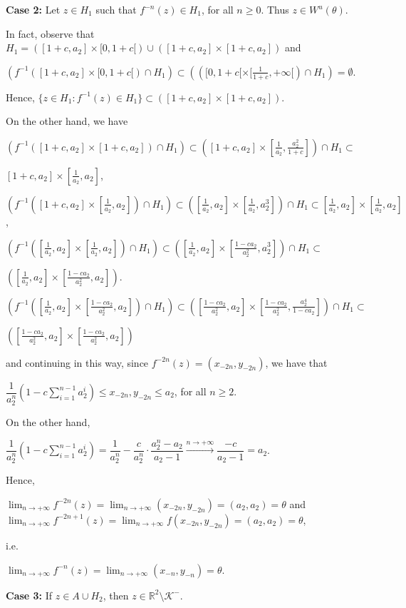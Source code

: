 \documentclass[11pt]{amsart}
\theoremstyle{definition}
\begin{document}
\noindent \textbf{Case 2:} Let $z\in H_1$ such that $f^{-n}(z)\in H_1$, for all $n\geq 0$.  Thus $z\in W^u(\theta)$.

In fact, observe that $H_1=([1+c,a_2]\times [0,1+c[)\cup ([1+c,a_2]\times
[1+c,a_2])$ and
\begin{center}
	$(f^{-1}([1+c,a_2]\times [0,1+c[)\cap H_1)\subset (([0,1+c[\times
	[\frac{1}{1+c},+\infty[)\cap H_1)=\emptyset$.
\end{center}
Hence, $\{z\in H_1: f^{-1}(z)\in H_1\}\subset ([1+c,a_2]\times
[1+c,a_2])$.

On the other hand, we have

\noindent $(f^{-1}([1+c,a_2]\times [1+c,a_2])\cap H_1)\subset ([1+c,a_2]\times
	[\frac{1}{a_2},\frac{a^2_2}{1+c}])\cap H_1\subset$

\hfill $[1+c,a_2]\times[\frac{1}{a_2},a_2]$,


\noindent $(f^{-1}([1+c,a_2]\times [\frac{1}{a_2},a_2])\cap H_1)\subset
	([\frac{1}{a_2},a_2]\times [\frac{1}{a_2},a^3_2])\cap H_1\subset
	[\frac{1}{a_2},a_2]\times[\frac{1}{a_2},a_2]$,

\noindent $(f^{-1}([\frac{1}{a_2},a_2]\times[\frac{1}{a_2},a_2])\cap
	H_1)\subset ([\frac{1}{a_2},a_2]\times[\frac{1-ca_2}{a_2^2},a_2^3
	])\cap H_1\subset$

\hfill $([\frac{1}{a_2},a_2]\times[\frac{1-ca_2}{a_2^2},a_2])$.

\noindent $(f^{-1}([\frac{1}{a_2},a_2]\times[\frac{1-ca_2}{a_2^2},a_2])\cap
	H_1)\subset ([\frac{1-ca_2}{a_2^2},a_2]
	\times[\frac{1-ca_2}{a_2^2},\frac{a_2^4}{1-ca_2} ])\cap H_1\subset$

\hfill $([\frac{1-ca_2}{a_2^2},a_2]\times[\frac{1-ca_2}{a_2^2},a_2])$

\noindent and continuing in this way, since $f^{-2n}(z)=(x_{-2n},y_{-2n})$, we have that
\begin{center}
	$\dfrac{1}{a_2^{n}}\displaystyle \left(1-c\sum_{i=1}^{n-1} a_2^i\right)\leq
	x_{-2n},y_{-2n}\leq a_2$, for all $n\geq 2$.
\end{center}

On the other hand,

\begin{center}
	$\dfrac{1}{a_2^{n}}\displaystyle \left(1-c\sum_{i=1}^{n-1}
	a_2^i\right)=\dfrac{1}{a_2^{n}}-\dfrac{c}{a_2^{n}}\cdot
	\dfrac{a_2^{n}-a_2}{a_2-1} \xrightarrow{n\to+\infty}\dfrac{-c}{a_2-1}=a_2$.
\end{center}

Hence,
\begin{center}
	$\displaystyle \lim_{n\to +\infty}f^{-2n}(z)=\lim_{n\to
		+\infty}(x_{-2n},y_{-2n})=(a_2,a_2)=\theta$ and
	$\displaystyle \lim_{n\to +\infty}f^{-2n+1}(z)=\displaystyle \lim_{n\to +\infty}f(x_{-2n},y_{-2n})=(a_2,a_2)=\theta$,
\end{center}
i.e.
\begin{center}
	$\displaystyle \lim_{n\to +\infty}f^{-n}(z)=\lim_{n\to
		+\infty}(x_{-n},y_{-n})=\theta$.
\end{center}
\noindent \textbf{Case 3:} If $z\in A\cup H_2$, then $z\in
\mathbb{R}^2\setminus \mathcal{K}^-$.
\end{document}
